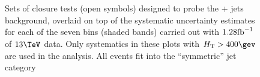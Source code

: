 \begin{figure}[h!]
  \begin{center}
     ~~
     \\
     ~~
     \\
    \caption{Sets of closure tests (open symbols) designed to probe
      the \znunu + jets background, overlaid on top of
      the systematic uncertainty estimates for each of the seven
      \scalht bins (shaded bands) carried out with $1.28\text{fb}^{-1}$ of
      $13\tev$ data. Only systematics in these plots with
      $\scalht>400\gev$ are used in the analysis. All events fit 
      into the ``symmetric'' jet
      category}
    \label{fig:ZinvclosureDataSymgt400}
  \end{center} 
\end{figure}

